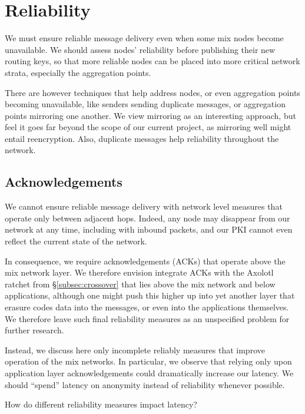 
\section{Reliability}

We must ensure reliable message delivery even when some mix nodes
become unavailable.  We should assess nodes' reliability before
publishing their new routing keys, so that more reliable nodes can
be placed into more critical network strata, especially the
aggregation points.

There are however techniques that help address nodes, or even
aggregation points becoming unavailable, like senders sending
duplicate messages, or aggregation points mirroring one another.
We view mirroring as an interesting approach, but feel it goes far
beyond the scope of our current project, as mirroring well might
entail reencryption.  Also, duplicate messages help reliability
throughout the network.


\subsection{Acknowledgements}

We cannot ensure reliable message delivery with network level
measures that operate only between adjacent hops.  Indeed, any node
may disappear from our network at any time, including with inbound
packets, and our PKI cannot even reflect the current state of the
network.

In consequence, we require acknowledgements (ACKs) that operate above
the mix network layer.  We therefore envision integrate ACKs with the
Axolotl ratchet from \S\ref{subsec:crossover} that lies above the mix
network and below applications, although one might push this higher
up into yet another layer that erasure codes data into the messages,
or even into the applications themselves. We therefore leave such 
final reliability measures as an unspecified problem for further
research.

Instead, we discuss here only incomplete reliably measures that
improve operation of the mix networks.  In particular, we observe
that relying only upon application layer acknowledgements could
dramatically increase our latency.  We should ``spend'' latency on
anonymity instead of reliability whenever possible.

\begin{issue}
How do different reliability measures impact latency?
\end{issue}

